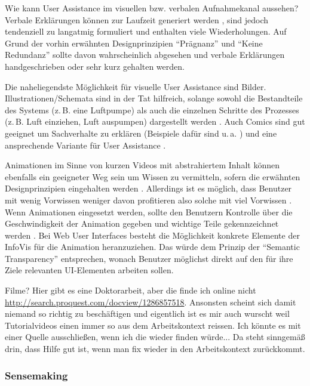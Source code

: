 \documentclass[
	headsepline,
	footsepline,
	fontsize=12pt,
	bibliography=totoc
]{scrbook}
\begin{document}

Wie kann User Assistance im visuellen bzw. verbalen Aufnahmekanal aussehen? Verbale Erklärungen können zur Laufzeit generiert werden \cite{Bauer2011, Gesell2012, Matheson2012}, sind jedoch tendenziell zu langatmig formuliert und enthalten viele Wiederholungen. Auf Grund der vorhin erwähnten Designprinzipien \enquote{Prägnanz} und \enquote{Keine Redundanz} sollte davon wahrscheinlich abgesehen und verbale Erklärungen handgeschrieben oder sehr kurz gehalten werden.

Die naheliegendste Möglichkeit für visuelle User Assistance sind Bilder. Illustrationen/Schemata sind in der Tat hilfreich, solange sowohl die Bestandteile des Systems (z.\,B. eine Luftpumpe) als auch die einzelnen Schritte des Prozesses (z.\,B. Luft einziehen, Luft auspumpen) dargestellt werden \cite{Mayer1990}. Auch Comics sind gut geeignet um Sachverhalte zu erklären (Beispiele dafür sind u.\,a. \cite{McCloud1994, McCloud2008}) und eine ansprechende Variante für User Assistance \cite{Webb2012}.

Animationen im Sinne von kurzen Videos mit abstrahiertem Inhalt können ebenfalls ein geeigneter Weg sein um Wissen zu vermitteln, sofern die erwähnten Designprinzipien eingehalten werden \cite{Mayer2002a}. Allerdings ist es möglich, dass Benutzer mit wenig Vorwissen weniger davon profitieren also solche mit viel Vorwissen \cite{Kalyuga2008}. Wenn Animationen eingesetzt werden, sollte den Benutzern Kontrolle über die Geschwindigkeit der Animation gegeben und wichtige Teile gekennzeichnet werden \cite{Wong2011}. Bei Web User Interfaces besteht die Möglichkeit konkrete Elemente der InfoVis für die Animation heranzuziehen. Das würde dem Prinzip der \enquote{Semantic Transparency} \cite{Kohlhase2009} entsprechen, wonach Benutzer möglichst direkt auf den für ihre Ziele relevanten UI-Elementen arbeiten sollen.

Filme? Hier gibt es eine Doktorarbeit, aber die finde ich online nicht \url{http://search.proquest.com/docview/1286857518}. Ansonsten scheint sich damit niemand so richtig zu beschäftigen und eigentlich ist es mir auch wurscht weil Tutorialvideos einen immer so aus dem Arbeitskontext reissen. Ich könnte es mit einer Quelle ausschließen, wenn ich die wieder finden würde... Da steht sinngemäß drin, dass Hilfe gut ist, wenn man fix wieder in den Arbeitskontext zurückkommt.


\subsubsection{Sensemaking}
\label{section:standderforschung:grundlagen:user_assistance:sensemaking}
\end{document}
